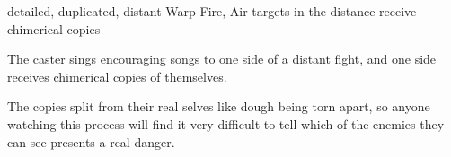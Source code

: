   {detailed, duplicated, distant}%
  {Warp}%
  {Fire, Air}%
  {}%
  { targets in the distance receive chimerical copies}%
  {
    The caster sings encouraging songs to one side of a distant fight, and one side receives chimerical copies of themselves.

    The copies split from their real selves like dough being torn apart, so anyone watching this process will find it very difficult to tell which of the enemies they can see presents a real danger.
  }

